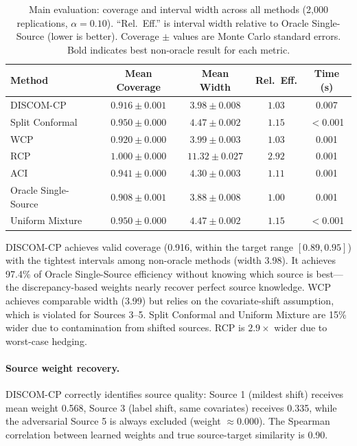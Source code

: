 \documentclass{article}
\newcommand{\DISCOM}{\textsc{DISCOM-CP}}
\begin{document}
\begin{table}[t]
\caption{Main evaluation: coverage and interval width across all methods (2,000 replications, $\alpha = 0.10$). ``Rel.\ Eff.'' is interval width relative to Oracle Single-Source (lower is better). Coverage $\pm$ values are Monte Carlo standard errors. Bold indicates best non-oracle result for each metric.}
\label{tab:mve}
\centering
\small
\begin{tabular}{lcccc}
\toprule
\textbf{Method} & \textbf{Mean Coverage} & \textbf{Mean Width} & \textbf{Rel.\ Eff.} & \textbf{Time (s)} \\
\midrule
\DISCOM{} & $\mathbf{0.916 \pm 0.001}$ & $\mathbf{3.98 \pm 0.008}$ & $\mathbf{1.03}$ & 0.007 \\
Split Conformal & $0.950 \pm 0.000$ & $4.47 \pm 0.002$ & $1.15$ & $<$0.001 \\
WCP & $0.920 \pm 0.000$ & $3.99 \pm 0.003$ & $1.03$ & 0.001 \\
RCP & $1.000 \pm 0.000$ & $11.32 \pm 0.027$ & $2.92$ & 0.001 \\
ACI & $0.941 \pm 0.000$ & $4.30 \pm 0.003$ & $1.11$ & 0.001 \\
Oracle Single-Source & $0.908 \pm 0.001$ & $3.88 \pm 0.008$ & $1.00$ & 0.001 \\
Uniform Mixture & $0.950 \pm 0.000$ & $4.47 \pm 0.002$ & $1.15$ & $<$0.001 \\
\bottomrule
\end{tabular}
\end{table}

\DISCOM{} achieves valid coverage (0.916, within the target range $[0.89, 0.95]$) with the tightest intervals among non-oracle methods (width 3.98). It achieves 97.4\% of Oracle Single-Source efficiency without knowing which source is best---the discrepancy-based weights nearly recover perfect source knowledge. WCP achieves comparable width (3.99) but relies on the covariate-shift assumption, which is violated for Sources 3--5. Split Conformal and Uniform Mixture are 15\% wider due to contamination from shifted sources. RCP is $2.9\times$ wider due to worst-case hedging.

\paragraph{Source weight recovery.}
\DISCOM{} correctly identifies source quality: Source 1 (mildest shift) receives mean weight 0.568, Source 3 (label shift, same covariates) receives 0.335, while the adversarial Source 5 is always excluded (weight $\approx 0.000$). The Spearman correlation between learned weights and true source-target similarity is 0.90.
\end{document}
